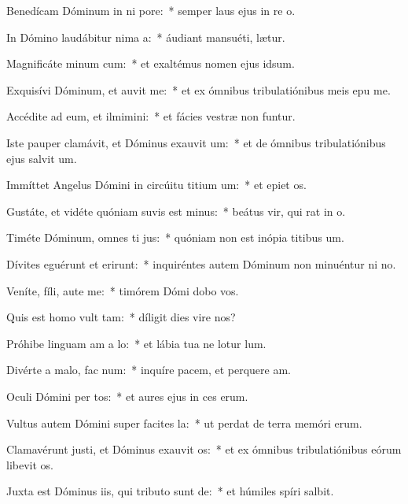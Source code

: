 \item Benedícam Dóminum in ni pore:~* semper laus ejus in re o.
\item In Dómino laudábitur nima a:~* áudiant mansuéti,  lætur.
\item Magnificáte minum cum:~* et exaltémus nomen ejus  idsum.
\item Exquisívi Dóminum, et auvit me:~* et ex ómnibus tribulatiónibus meis epu me.
\item Accédite ad eum, et ilmimini:~* et fácies vestræ non funtur.
\item Iste pauper clamávit, et Dóminus exauvit um:~* et de ómnibus tribulatiónibus ejus salvit um.
\item Immíttet Angelus Dómini in circúitu titium um:~* et epiet os.
\item Gustáte, et vidéte quóniam suvis est minus:~* beátus vir, qui rat in o.
\item Timéte Dóminum, omnes ti jus:~* quóniam non est inópia titibus um.
\item Dívites eguérunt et erirunt:~* inquiréntes autem Dóminum non minuéntur ni no.
\item Veníte, fíli, aute me:~* timórem Dómi dobo vos.
\item Quis est homo  vult tam:~* díligit dies vire nos?
\item Próhibe linguam am a lo:~* et lábia tua ne lotur lum.
\item Divérte a malo,  fac num:~* inquíre pacem, et perquere am.
\item Oculi Dómini per tos:~* et aures ejus in ces erum.
\item Vultus autem Dómini super facites la:~* ut perdat de terra memóri erum.
\item Clamavérunt justi, et Dóminus exauvit os:~* et ex ómnibus tribulatiónibus eórum libevit os.
\item Juxta est Dóminus iis, qui tributo sunt de:~* et húmiles spíri salbit.
